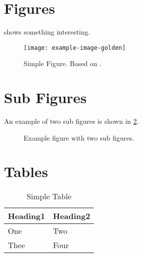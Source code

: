 \documentclass[
  fontsize=10pt
  numbers=noenddot,
  english,  %
  paper=a5,
  twoside,  %
  DIV=calc,
  headings=small,
  bibliography=totoc,
  listof=totoc,
  draft=false
]{scrbook}
\theoremstyle{break}
\begin{document}
\section{Figures}

\begin{ltgexample}
 shows something interesting.

\begin{figure}
  \centering
  \texttt{[image: example-image-golden]}
  \caption[Simple Figure]{Simple Figure. Based on \citet{mwe}.}
  \label{fig:label}
\end{figure}
\end{ltgexample}

\section{Sub Figures}

An example of two sub figures is shown in \cref{fig:two_sub_figures}.

\begin{ltgexample}
\begin{figure}[!b]
    \centering
  \hfil
  \caption{Example figure with two sub figures.}
  \label{fig:two_sub_figures}
\end{figure}
\end{ltgexample}

\section{Tables}

\begin{ltgexample}
\begin{table}
  \caption{Simple Table}
  \label{tab:simple}
  \centering
  \begin{tabular}{ll}
    \toprule
    Heading1 & Heading2 \\
    \midrule
    One      & Two      \\
    Thee     & Four     \\
    \bottomrule
  \end{tabular}
\end{table}
\end{ltgexample}
\end{document}
